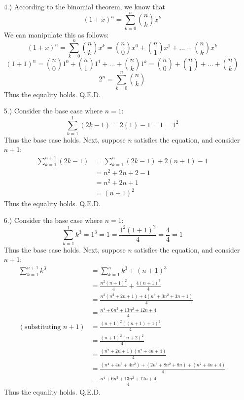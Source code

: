\documentclass[12pt]{article}
\begin{document}
\begin{itemize}
    \item [4.)] According to the binomial theorem, we know that
    \begin{equation*}
        (1+x)^n=\sum_{k=0}^{n}\binom{n}{k}x^k
    \end{equation*}
    We can manipulate this as follows:
    \begin{equation*}
        (1+x)^n=\sum_{k=0}^{n}\binom{n}{k}x^k=\binom{n}{0}x^0+\binom{n}{1}x^1+\hdots+\binom{n}{k}x^k
    \end{equation*}
    \begin{equation*}
        (1+1)^n=\binom{n}{0}1^0+\binom{n}{1}1^1+\hdots+\binom{n}{k}1^k=\binom{n}{0}+\binom{n}{1}+\hdots+\binom{n}{k}
    \end{equation*}
    \begin{equation*}
        2^n=\sum_{k=0}^{n}\binom{n}{k}
    \end{equation*}
    Thus the equality holds. Q.E.D.

    \item [5.)] Consider the base case where $n=1$:
    \begin{equation*}
        \sum_{k=1}^{1}(2k-1)=2(1)-1=1=1^2
    \end{equation*}
    Thus the base case holds. Next, suppose $n$ satisfies the equation, and consider $n+1$:
    \begin{align*}
        \sum_{k=1}^{n+1}(2k-1)&=\sum_{k=1}^{n}(2k-1)+2(n+1)-1\\
        &=n^2+2n+2-1\\
        &=n^2+2n+1\\
        &=(n+1)^2
    \end{align*}
    Thus the equality holds. Q.E.D.

    \item [6.)] Consider the base case where $n=1$:
    \begin{equation*}
        \sum_{k=1}^{1}k^3=1^3=1=\frac{1^2(1+1)^2}{4}=\frac{4}{4}=1
    \end{equation*}
    Thus the base case holds. Next, suppose $n$ satisfies the equation, and consider $n+1$:
    \begin{align*}
        \sum_{k=1}^{n+1}k^3&=\sum_{k=1}^{n}k^3+(n+1)^3\\
        &=\frac{n^2(n+1)^2}{4}+\frac{4(n+1)^3}{4}\\
        &=\frac{n^2(n^2+2n+1)+4(n^3+3n^2+3n+1)}{4}\\
        &=\frac{n^4+6n^3+13n^2+12n+4}{4}\\
        (\text{substituting }n+1)&=\frac{(n+1)^2((n+1)+1)^2}{4}\\
        &=\frac{(n+1)^2(n+2)^2}{4}\\
        &=\frac{(n^2+2n+1)(n^2+4n+4)}{4}\\
        &=\frac{(n^4+4n^3+4n^2)+(2n^3+8n^2+8n)+(n^2+4n+4)}{4}\\
        &=\frac{n^4+6n^3+13n^2+12n+4}{4}
    \end{align*}
    Thus the equality holds. Q.E.D.


\end{itemize}
\end{document}
